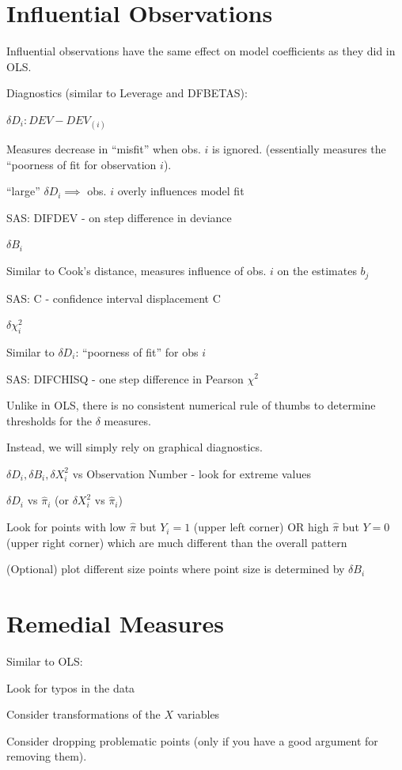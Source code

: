 \documentclass[12pt]{notes}
\begin{document}
\section{Influential Observations}
\nspace
Influential observations have the same effect on model coefficients as they did in OLS. 

\nspace
Diagnostics (similar to Leverage and DFBETAS):
\bi
\item $\delta D_i: DEV - DEV_{(i)}$
\bi
\item Measures decrease in ``misfit'' when obs. $i$ is ignored. (essentially measures the ``poorness of fit for observation $i$). 
\item ``large'' $\delta D_i \implies$ obs. $i$ overly influences model fit
\item SAS: DIFDEV - on step difference in deviance 
\ei
\item $\delta B_i$
\bi
\item Similar to Cook's distance, measures influence of obs. $i$ on the estimates $b_j$
\item SAS: C - confidence interval displacement C
\ei
\item $\delta \chi^2_i$
\bi
\item Similar to $\delta D_i$: ``poorness of fit'' for obs $i$
\item SAS: DIFCHISQ - one step difference in Pearson $\chi^2$
\ei
\ei

\nspace 
Unlike in OLS, there is no consistent numerical rule of thumbs to determine thresholds for the $\delta$ measures. 

\nspace
Instead, we will simply rely on graphical diagnostics. 
\bi
\item $\delta D_i, \delta B_i, \delta X_i^2$ vs Observation Number - look for extreme values 
\item $\delta D_i$ vs $\hat{\pi}_i$ (or $\delta X_i^2$ vs $\hat{\pi}_i$)
\bi
\item Look for points with low $\hat{\pi}$ but $Y_i = 1$ (upper left corner) OR high $\hat{\pi}$ but $Y=0$ (upper right corner) which are much different than the overall pattern
\item (Optional) plot different size points where point size is determined by $\delta B_i$
\ei
\ei

\section{Remedial Measures}
Similar to OLS:
\bi
\item Look for typos in the data
\item Consider transformations of the $X$ variables
\item Consider dropping problematic points (only if you have a good argument for removing them). 
\ei
\end{document}
